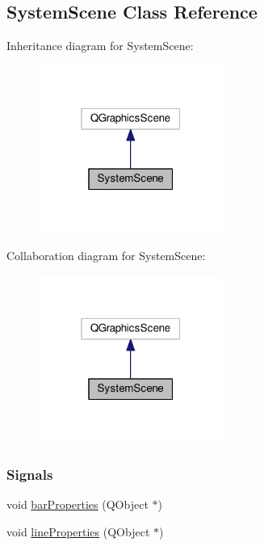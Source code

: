 \hypertarget{class_system_scene}{}\subsection{System\+Scene Class Reference}
\label{class_system_scene}


Inheritance diagram for System\+Scene\+:
\nopagebreak
\begin{figure}[H]
\begin{center}
\leavevmode
\includegraphics[width=171pt]{class_system_scene__inherit__graph}
\end{center}
\end{figure}


Collaboration diagram for System\+Scene\+:
\nopagebreak
\begin{figure}[H]
\begin{center}
\leavevmode
\includegraphics[width=171pt]{class_system_scene__coll__graph}
\end{center}
\end{figure}
\subsubsection*{Signals}
\begin{DoxyCompactItemize}
\item 
void \hyperlink{class_system_scene_aee42d6dbe1c5ba614db983855c64b867}{bar\+Properties} (Q\+Object $\ast$)
\item 
void \hyperlink{class_system_scene_a1053da0c1a6498966267ec152b4850f3}{line\+Properties} (Q\+Object $\ast$)
\end{DoxyCompactItemize}
